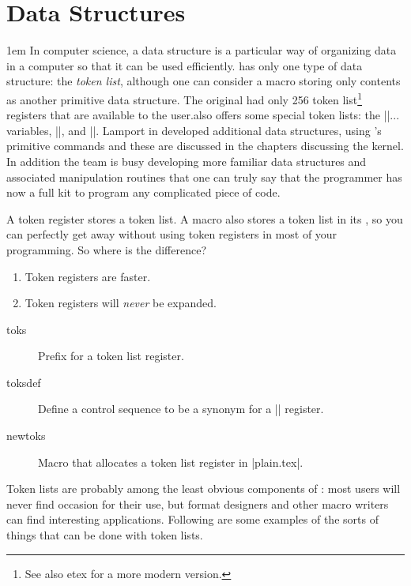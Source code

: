 \chapter[Data Structures]{Data Structures}

\parindent1em 
In computer science, a data structure is a particular way of organizing data in a computer so that it can be
used efficiently. \tex has only one type of data structure: the \emph{token list}, although one can consider a macro storing only contents as another primitive data structure. The original \tex had only 256 token list\footnote{See also etex for a more modern version.} registers that are
available to the user.\tex also offers some special token lists: the |\every|... variables, |\errhelp|,
and |\output|. Lamport in \latex developed additional data structures, using \tex’s primitive commands and  these are discussed in the chapters discussing the \latex kernel. In addition the  team is busy developing more familiar data structures and associated manipulation routines that one can truly say that the \tex programmer has now a full kit to program any complicated piece of code.


A token register stores a token list. A macro also stores a token list in its , so you can perfectly get away without using token registers in most of your \tex programming. So where is the difference?

\begin{enumerate}
\item Token registers are faster.
\item Token registers will \emph{never} be expanded.
\end{enumerate} 


\begin{description}
\item [toks] Prefix for a token list register.
\item [toksdef]  Define a control sequence to be a synonym for a |\toks| register.
\item [newtoks] Macro that allocates a token list register in |plain.tex|.
\end{description}


Token lists are probably among the least obvious components of \tex: most \tex users will never
find occasion for their use, but format designers and other macro writers can find interesting
applications. Following are some examples of the sorts of things that can be done with token lists.

